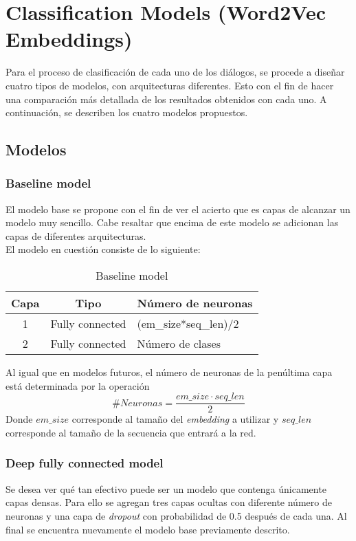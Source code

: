 \section{Classification Models (Word2Vec Embeddings)}
\label{sec:deepModels}
Para el proceso de clasificación de cada uno de los diálogos, se procede a diseñar cuatro tipos de modelos, con arquitecturas diferentes. Esto con el fin de hacer una comparación más detallada de los resultados obtenidos con cada uno. A continuación, se describen los cuatro modelos propuestos.

\subsection{Modelos}
\subsubsection{Baseline model}
El modelo base se propone con el fin de ver el acierto que es capas de alcanzar un modelo muy sencillo. Cabe resaltar que encima de este modelo se adicionan las capas de diferentes arquitecturas.\\

El modelo en cuestión consiste de lo siguiente:

\begin{table}[H]
\centering
\caption{Baseline model}
\label{tab:baseline_1}
\begin{tabular}{|c|l|l|}
\hline
\textbf{Capa} & \multicolumn{1}{c|}{\textbf{Tipo}} & \multicolumn{1}{c|}{\textbf{Número de neuronas}} \\ \hline
1             & Fully connected                    & (em\_size*seq\_len)/2                            \\ \hline
2             & Fully connected                    & Número de clases                                 \\ \hline
\end{tabular}
\end{table}

Al igual que en modelos futuros, el número de neuronas de la penúltima capa está determinada por la operación
\begin{equation}
    \# Neuronas = \frac{em\_size \cdot seq\_len}{2}
\end{equation}
Donde $em\_size$ corresponde al tamaño del \textit{embedding} a utilizar y $seq\_len$ corresponde al tamaño de la secuencia que entrará a la red.

\subsubsection{Deep fully connected model}
Se desea ver qué tan efectivo puede ser un modelo que contenga únicamente capas densas. Para ello se agregan tres capas ocultas con diferente número de neuronas y una capa de \textit{dropout} con probabilidad de 0.5 después de cada una. Al final se encuentra nuevamente el modelo base previamente descrito.

